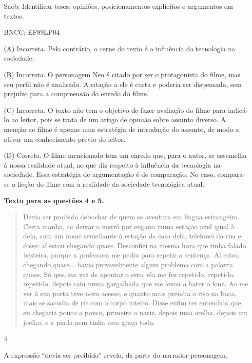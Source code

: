 Saeb: Identificar teses, opiniões, posicionamentos explícitos e
argumentos em textos.

BNCC: EF89LP04

(A) Incorreta. Pelo contrário, o cerne do texto é a influência da
tecnologia na sociedade.

(B) Incorreta. O personagem Neo é citado por ser o protagonista do
filme, mas seu perfil não é analisado. A citação a ele é curta e poderia
ser dispensada, sem prejuízo para a compreensão do enredo do filme.

(C) Incorreta. O texto não tem o objetivo de fazer avaliação do filme
para indicá-lo ao leitor, pois se trata de um artigo de opinião sobre
assunto diverso. A menção ao filme é apenas uma estratégia de introdução
do assunto, de modo a ativar um conhecimento prévio do leitor.

(D) Correta. O filme mencionado tem um enredo que, para o autor, se
assemelha à nossa realidade atual, no que diz respeito à influência da
tecnologia na sociedade. Essa estratégia de argumentação é de
comparação. No caso, compara-se a ficção do filme com a realidade da
sociedade tecnológica atual.

\textbf{Texto para as questões 4 e 5.}

\begin{quote}
Devia ser proibido debochar de quem se aventura em língua estrangeira.
Certa manhã, ao deixar o metrô por engano numa estação azul igual à
dela, com um nome semelhante à estação da casa dela, telefonei da rua e
disse: aí estou chegando quase. Desconfiei na mesma hora que tinha
falado besteira, porque a professora me pediu para repetir a sentença.
Aí estou chegando quase... havia provavelmente algum problema com a
palavra quase. Só que, em vez de apontar o erro, ela me fez repeti-lo,
repeti-lo, repeti-lo, depois caiu numa gargalhada que me levou a bater o
fone. Ao me ver à sua porta teve novo acesso, e quanto mais prendia o
riso na boca, mais se sacudia de rir com o corpo inteiro. Disse enfim
ter entendido que eu chegaria pouco a pouco, primeiro o nariz, depois
uma orelha, depois um joelho, e a piada nem tinha essa graça toda.
\end{quote}


\num{4}

A expressão ``devia ser proibido'' revela, da parte do
narrador-personagem,

